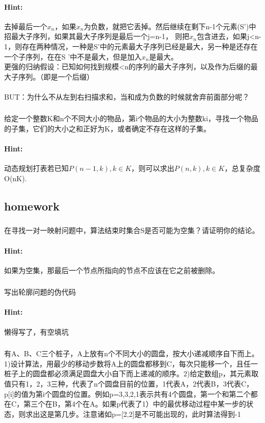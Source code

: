 \documentclass{article}
\begin{document}
     \paragraph{Hint:}去掉最后一个$x_{n}$，如果$x_{n}$为负数，就把它丢掉。然后继续在剩下n-1个元素(S')中招最大子序列，如果其最大子序列是最后一个j=n-1， 则把$x_{n}$包含进去，如果j<n-1，则存在两种情况，一种是S'中的元素最大子序列已经是最大，另一种是还存在一个子序列，在在S
'中不是最大，但是加入$x_{n}$是最大。\\
更强的归纳假设：已知如何找到规模<n的序列的最大子序列，以及作为后缀的最大子序列。（即是一个后缀）\\
\\
BUT：为什么不从左到右扫描求和，当和成为负数的时候就舍弃前面部分呢？\\
     \subsubsection{}给定一个整数K和n个不同大小的物品，第i个物品的大小为整数ki，寻找一个物品的子集，它们的大小之和正好为K，或者确定不存在这样的子集。
     \paragraph{Hint:}动态规划打表若已知$P(n-1,k),k\in K$，则可以求出$P(n,k),k\in K$，总复杂度O(nK).
      \subsection{homework}
      
     \subsubsection{}在寻找一对一映射问题中，算法结束时集合S是否可能为空集？请证明你的结论。
     \paragraph{Hint:}如果为空集，那最后一个节点所指向的节点不应该在它之前被删除。
     
     \subsubsection{}写出轮廓问题的伪代码
     \paragraph{Hint:}懒得写了，有空填坑
     
     \subsubsection{}有A、B、C三个桩子，A上放有n个不同大小的圆盘，按大小递减顺序自下而上。1)设计算法，用最少的移动步数将A上的圆盘都移到C，每次只能移一个，且任一桩子上的圆盘都必须满足圆盘大小自下而上递减的顺序。2)给定数组p，其元素取值只有1，2，3三种，代表了n个圆盘目前的位置，1代表A，2代表B，3代表C，p[i]的值为第i个圆盘的位置。例如p={3,3,2,1}表示共有4个圆盘，第一个和第二个都在C，第三个在B，第4个在A。如果p代表了1）中的最优移动过程中某一步的状态，则求出这是第几步。注意诸如p=[2,2]是不可能出现的，此时算法得到-1
\end{document}
